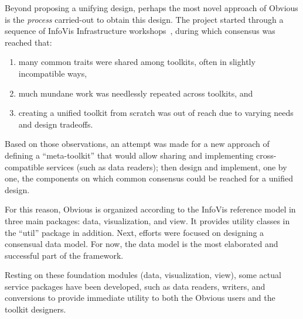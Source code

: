 Beyond proposing a unifying design, perhaps the most novel approach of
Obvious is the \emph{process} carried-out to obtain this design.  The
project started through a sequence of InfoVis Infrastructure
workshops~\cite{visinfrastructure2, vismaster2008,visinfrastructure1},
during which consensus was reached that:

\begin{enumerate}[noitemsep]
\item many common traits were shared among toolkits, often in slightly
  incompatible ways,
\item much mundane work was needlessly repeated across toolkits, and
\item creating a unified toolkit from scratch was out of reach due to
  varying needs and design tradeoffs.
\end{enumerate}

Based on those observations, an attempt was made for a new approach of
defining a ``meta-toolkit'' that would allow sharing and implementing
cross-compatible services (such as data readers); then design and
implement, one by one, the components on which common consensus could
be reached for a unified design.

For this reason, Obvious is organized according to the InfoVis
reference model in three main packages: data, visualization, and
view. It provides utility classes in the ``util'' package in addition.
Next, efforts were focused on designing a consensual data model. For
now, the data model is the most elaborated and successful part of the
framework.

Resting on these foundation modules (data, visualization, view), some
actual service packages have been developed, such as data readers,
writers, and conversions to provide immediate utility to both the
Obvious users and the toolkit designers.

